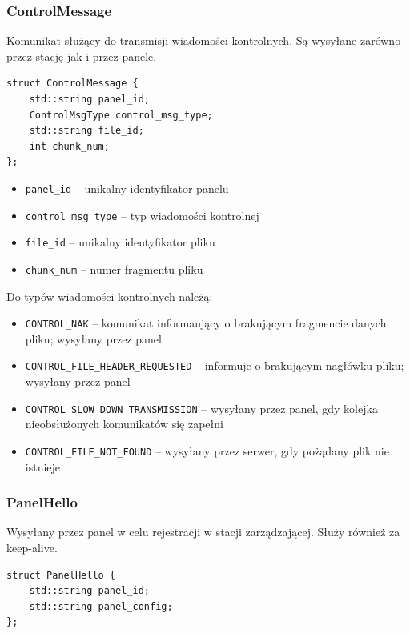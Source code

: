 \documentclass[12pt, a4paper]{article}
\providecommand{\tightlist}{%
  \setlength{\itemsep}{0pt}\setlength{\parskip}{0pt}}
\begin{document}
\hypertarget{control-message}{%
\subsubsection{ControlMessage}\label{control-message}}

Komunikat służący do transmisji wiadomości kontrolnych. Są wysyłane zarówno przez stację jak i przez panele.

\begin{verbatim}
struct ControlMessage {
    std::string panel_id;
    ControlMsgType control_msg_type;
    std::string file_id;
    int chunk_num;
};
\end{verbatim}

\begin{itemize}
\tightlist
    \item \texttt{panel\_id} -- unikalny identyfikator panelu
    \item \texttt{control\_msg\_type} -- typ wiadomości kontrolnej
    \item \texttt{file\_id} -- unikalny identyfikator pliku
    \item \texttt{chunk\_num} -- numer fragmentu pliku
\end{itemize}

Do typów wiadomości kontrolnych należą:

\begin{itemize}
\tightlist
    \item \texttt{CONTROL\_NAK} -- komunikat informaujący o brakującym fragmencie danych pliku; wysyłany przez panel
    \item \texttt{CONTROL\_FILE\_HEADER\_REQUESTED} -- informuje o brakującym nagłówku pliku; wysyłany przez panel
    \item \texttt{CONTROL\_SLOW\_DOWN\_TRANSMISSION} -- wysyłany przez panel, gdy kolejka nieobsłużonych komunikatów się zapełni
    \item \texttt{CONTROL\_FILE\_NOT\_FOUND} -- wysyłany przez serwer, gdy pożądany plik nie istnieje 
\end{itemize}

\hypertarget{panel-hello}{%
\subsubsection{PanelHello}\label{panel-hello}}

Wysyłany przez panel w celu rejestracji w stacji zarządzającej. Służy również za keep-alive.

\begin{verbatim}
struct PanelHello {
    std::string panel_id;
    std::string panel_config;
};
\end{verbatim}
\end{document}
